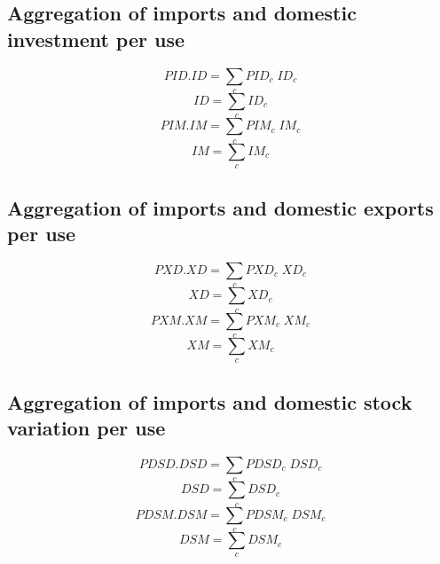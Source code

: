\documentclass[12pt]{article}
\numberwithin{equation}{section}
\begin{document}
\subsection{Aggregation of imports and domestic investment per use}



\begin{dmath}
PID . ID = \sum_{c} PID_{c} \; ID_{c}
\end{dmath}
\begin{dmath}
ID = \sum_{c} ID_{c}
\end{dmath}
\begin{dmath}
PIM . IM = \sum_{c} PIM_{c} \; IM_{c}
\end{dmath}
\begin{dmath}
IM = \sum_{c} IM_{c}
\end{dmath}



\subsection{Aggregation of imports and domestic exports per use}



\begin{dmath}
PXD . XD = \sum_{c} PXD_{c} \; XD_{c}
\end{dmath}
\begin{dmath}
XD = \sum_{c} XD_{c}
\end{dmath}
\begin{dmath}
PXM . XM = \sum_{c} PXM_{c} \; XM_{c}
\end{dmath}
\begin{dmath}
XM = \sum_{c} XM_{c}
\end{dmath}



\subsection{Aggregation of imports and domestic stock variation per use}



\begin{dmath}
PDSD . DSD = \sum_{c} PDSD_{c} \; DSD_{c}
\end{dmath}
\begin{dmath}
DSD = \sum_{c} DSD_{c}
\end{dmath}
\begin{dmath}
PDSM . DSM = \sum_{c} PDSM_{c} \; DSM_{c}
\end{dmath}
\begin{dmath}
DSM = \sum_{c} DSM_{c}
\end{dmath}
\end{document}

